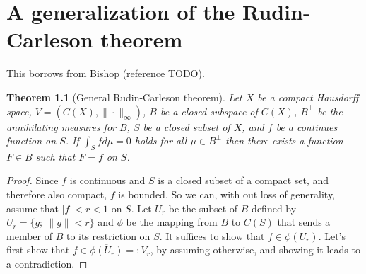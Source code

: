 \documentclass[a4paper,12pt,twoside,BCOR=10mm]{scrbook}
\newtheorem{theorem}{Theorem}
\begin{document}
\chapter{A generalization of the Rudin-Carleson theorem}
This borrows from Bishop (reference TODO).
\begin{theorem}[General Rudin-Carleson theorem]
Let $X$ be a compact Hausdorff space,
	$V = (C(X), \| \cdot \|_{\infty})$,
	$B$ be a closed subspace of $C(X)$,
	$B^{\bot}$ be the annihilating measures for $B$,
	$S$ be a closed subset of $X$,
	and $f$ be a continues function on $S$.
If $\int_S f d\mu = 0$ holds for all $\mu \in B^{\bot}$ then there exists a function $F \in B$ such that $F = f$ on $S$.
\end{theorem}
\begin{proof}
Since $f$ is continuous and $S$ is a closed subset of a compact set, and therefore also compact, $f$ is bounded.
So we can, with out loss of generality, assume that $|f| < r < 1$ on $S$.
Let $U_r$ be the subset of $B$ defined by $U_r = \{g;\ \|g\| < r\}$ and $\phi$ be the mapping from $B$ to $C(S)$ that sends a member of $B$ to its restriction on $S$.
It suffices to show that $f \in \phi(U_r)$.
Let's first show that $f \in \overline{\phi(U_r)} =: V_r$, by assuming otherwise, and showing it leads to a contradiction.


\end{proof}
\end{document}

